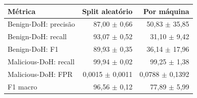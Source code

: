 \begin{tabular}{lrr}
\hline
\textbf{Métrica} & \textbf{Split aleatório} & \textbf{Por máquina} \\ \hline
Benign-DoH: precisão & 87,00 $\pm$ 0,66 & 50,83 $\pm$ 35,85 \\
Benign-DoH: recall & 93,07 $\pm$ 0,52 & 31,10 $\pm$ 9,42 \\
Benign-DoH: F1 & 89,93 $\pm$ 0,35 & 36,14 $\pm$ 17,96 \\
Malicious-DoH: recall & 99,94 $\pm$ 0,02 & 99,25 $\pm$ 1,38 \\
Malicious-DoH: FPR & 0,0015 $\pm$ 0,0011 & 0,0788 $\pm$ 0,1392 \\
F1 macro & 96,56 $\pm$ 0,12 & 77,89 $\pm$ 5,99 \\
\hline
\end{tabular}
